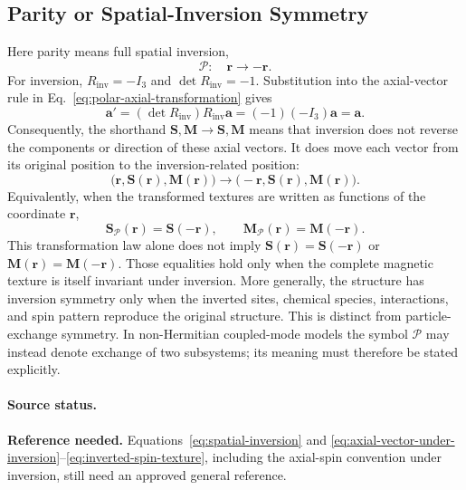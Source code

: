 \subsection{Parity or Spatial-Inversion Symmetry}

Here parity means full spatial inversion,
\begin{equation}
    \mathcal{P}:\quad \mathbf{r}\to-\mathbf{r}.
    \label{eq:spatial-inversion}
\end{equation}
For inversion, $R_{\mathrm{inv}}=-I_3$ and $\det R_{\mathrm{inv}}=-1$.
Substitution into the axial-vector rule in
Eq.~\eqref{eq:polar-axial-transformation} gives
\begin{equation}
    \mathbf{a}'=(\det R_{\mathrm{inv}})R_{\mathrm{inv}}\mathbf{a}
    =(-1)(-I_3)\mathbf{a}=\mathbf{a}.
    \label{eq:axial-vector-under-inversion}
\end{equation}
Consequently, the shorthand
$\mathbf{S},\mathbf{M}\to\mathbf{S},\mathbf{M}$ means that inversion does
not reverse the components or direction of these axial vectors.  It does move
each vector from its original position to the inversion-related position:
\begin{equation}
    \bigl(\mathbf{r},\mathbf{S}(\mathbf{r}),\mathbf{M}(\mathbf{r})\bigr)
    \to
    \bigl(-\mathbf{r},\mathbf{S}(\mathbf{r}),\mathbf{M}(\mathbf{r})\bigr).
    \label{eq:axial-vectors-moved-by-inversion}
\end{equation}
Equivalently, when the transformed textures are written as functions of the
coordinate $\mathbf{r}$,
\begin{equation}
    \mathbf{S}_{\mathcal{P}}(\mathbf{r})=\mathbf{S}(-\mathbf{r}),
    \qquad
    \mathbf{M}_{\mathcal{P}}(\mathbf{r})=\mathbf{M}(-\mathbf{r}).
    \label{eq:inverted-spin-texture}
\end{equation}
This transformation law alone does not imply
$\mathbf{S}(\mathbf{r})=\mathbf{S}(-\mathbf{r})$ or
$\mathbf{M}(\mathbf{r})=\mathbf{M}(-\mathbf{r})$.  Those equalities hold only
when the complete magnetic texture is itself invariant under inversion.  More
generally, the structure has inversion symmetry only when the inverted sites,
chemical species, interactions, and spin pattern reproduce the original
structure.
This is distinct from particle-exchange symmetry.  In non-Hermitian coupled-mode
models the symbol $\mathcal{P}$ may instead denote exchange of two subsystems;
its meaning must therefore be stated explicitly.

\paragraph{Source status.}
\textbf{Reference needed.}  Equations~\eqref{eq:spatial-inversion} and
\eqref{eq:axial-vector-under-inversion}--\eqref{eq:inverted-spin-texture},
including the axial-spin convention under inversion, still need an approved
general reference.

